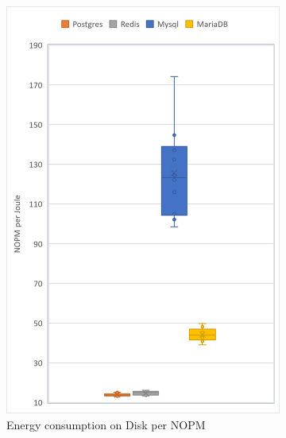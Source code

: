\begin{figure}[!ht]
\begin{subfigure}[b]{0.32\textwidth}
            \includegraphics[width=1\columnwidth]{results/boxplot/Disk-nopm.png}
            \caption[]%
            {{\small Energy consumption on Disk per NOPM}}    
            \label{fig:bocplotnopmdisk}
        \end{subfigure}
        \begin{subfigure}[b]{0.32\textwidth}  
            \centering 

\end{subfigure}
\end{figure}
